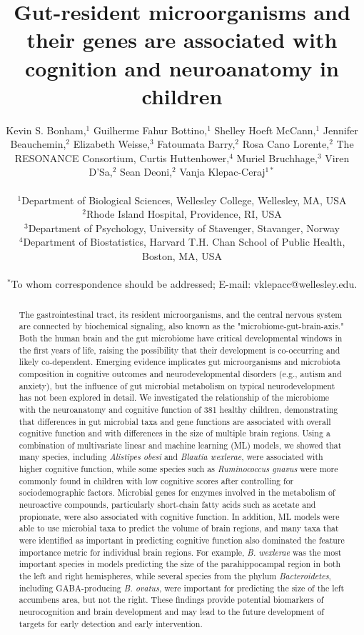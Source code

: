 \documentclass{article}
\title{Gut-resident microorganisms and their genes are associated with cognition and neuroanatomy in children}
\author{%
    \parbox{\linewidth}{\centering
        Kevin S. Bonham,$^{1}$
        Guilherme Fahur Bottino,$^{1}$
        Shelley Hoeft McCann,$^{1}$
        Jennifer Beauchemin,$^{2}$
        Elizabeth Weisse,$^{3}$
        Fatoumata Barry,$^{2}$
        Rosa Cano Lorente,$^{2}$
        The RESONANCE Consortium,
        Curtis Huttenhower,$^{4}$
        Muriel Bruchhage,$^{3}$
        Viren D'Sa,$^{2}$
        Sean Deoni,$^{2}$
        Vanja Klepac-Ceraj$^{1\ast}$
    }
\\
\normalsize{$^{1}$Department of Biological Sciences, Wellesley College, Wellesley, MA, USA}\\
\normalsize{$^{2}$Rhode Island Hospital, Providence, RI, USA}\\
\normalsize{$^{3}$Department of Psychology, University of Stavenger, Stavanger, Norway}\\
\normalsize{$^{4}$Department of Biostatistics, Harvard T.H. Chan School of Public Health, Boston, MA, USA}\\
\\
\normalsize{$^\ast$To whom correspondence should be addressed; E-mail:  vklepacc@wellesley.edu.}
}
\date{}
\begin{document}
\baselineskip24pt

\maketitle 

\begin{abstract}
The gastrointestinal tract, its resident microorganisms, and the central
nervous system are connected by biochemical signaling, also known as the
"microbiome-gut-brain-axis." Both the human brain and the gut microbiome
have critical developmental windows in the first years of life,
raising the possibility that their development is co-occurring and
likely co-dependent. Emerging evidence implicates gut microorganisms and
microbiota composition in cognitive outcomes and neurodevelopmental
disorders (e.g., autism and anxiety), but the influence of gut microbial
metabolism on typical neurodevelopment has not been explored in detail.
We investigated the relationship of the microbiome with the neuroanatomy
and cognitive function of 381 healthy children, demonstrating that
differences in gut microbial taxa and gene functions are associated with
overall cognitive function and with differences in the size of
multiple brain regions.
Using a combination of multivariate linear and machine learning (ML) models,
we showed that many species,
including \emph{Alistipes obesi} and \emph{Blautia wexlerae}, were %
associated with higher cognitive function, while some
species such as \emph{Ruminococcus gnavus} were more commonly found in %
children with low cognitive scores after controlling for sociodemographic factors.
Microbial genes for enzymes involved in the metabolism of
neuroactive compounds, particularly short-chain fatty acids such as
acetate and propionate, were also associated with cognitive function.
In addition, ML models were able to use microbial taxa to predict the
volume of brain regions, and many taxa that were identified
as important in predicting cognitive function also dominated the
feature importance metric for individual brain regions.
For example, \emph{B. wexlerae} %
was the most important species in models predicting the size of the parahippocampal region
in both the left and right hemispheres, while several species from
the phylum \textit{Bacteroidetes}, including GABA-producing %
\emph{B. ovatus}, were important for predicting
the size of the left accumbens area, but not the right. These
findings provide potential biomarkers of neurocognition and brain development
and may lead to the future development of targets for early detection and early
intervention.
\end{abstract}
\end{document}

